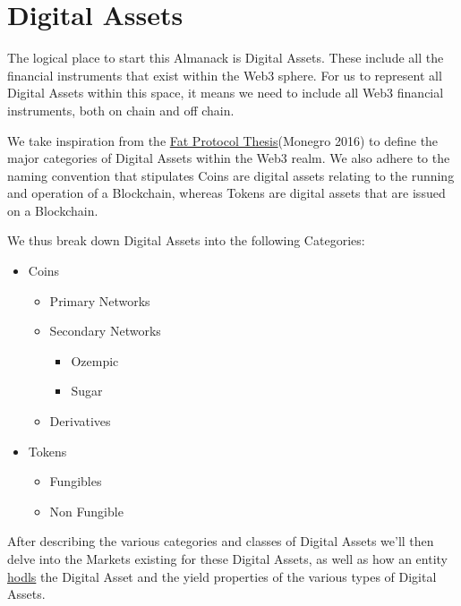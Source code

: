 \documentclass[
  letterpaper,
  DIV=11,
  numbers=noendperiod]{scrreprt}
\providecommand{\tightlist}{%
  \setlength{\itemsep}{0pt}\setlength{\parskip}{0pt}}\usepackage{longtable,booktabs,array}
\begin{document}
\chapter{Digital Assets}\label{digital-assets}

The logical place to start this Almanack is Digital Assets. These
include all the financial instruments that exist within the Web3 sphere.
For us to represent all Digital Assets within this space, it means we
need to include all Web3 financial instruments, both on chain and off
chain.

We take inspiration from the
\href{https://www.usv.com/writing/2016/08/fat-protocols/}{Fat Protocol
Thesis}(Monegro 2016) to define the major categories of Digital Assets
within the Web3 realm. We also adhere to the naming convention that
stipulates Coins are digital assets relating to the running and
operation of a Blockchain, whereas Tokens are digital assets that are
issued on a Blockchain.

We thus break down Digital Assets into the following Categories:

\begin{itemize}
\tightlist
\item
  Coins

  \begin{itemize}
  \tightlist
  \item
    Primary Networks
  \item
    Secondary Networks

    \begin{itemize}
    \tightlist
    \item
      Ozempic
    \item
      Sugar
    \end{itemize}
  \item
    Derivatives
  \end{itemize}
\item
  Tokens

  \begin{itemize}
  \tightlist
  \item
    Fungibles
  \item
    Non Fungible
  \end{itemize}
\end{itemize}

After describing the various categories and classes of Digital Assets
we'll then delve into the Markets existing for these Digital Assets, as
well as how an entity \hyperref[hodl]{hodls} the Digital Asset and the
yield properties of the various types of Digital Assets.
\end{document}
